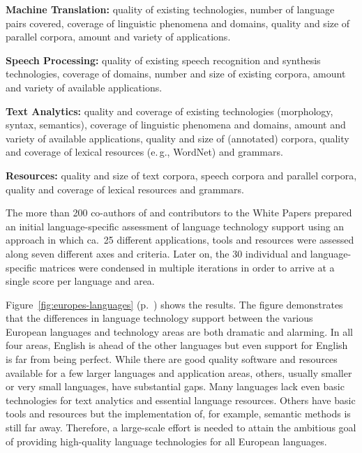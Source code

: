\documentclass[10pt, plain]{../../metanetpaper}
\begin{document}
\begin{multicols}{2}
\textbf{Machine Translation:} quality of existing technologies, number of language pairs covered, coverage of linguistic phenomena and domains, quality and size of parallel corpora, amount and variety of applications.

\textbf{Speech Processing:} quality of existing speech recognition and synthesis technologies, coverage of domains, number and size of existing corpora, amount and variety of available applications.

\textbf{Text Analytics:} quality and coverage of existing technologies (morphology, syntax, semantics), coverage of linguistic phenomena and domains, amount and variety of available applications, quality and size of (annotated) corpora, quality and coverage of lexical resources (e.\,g., WordNet) and grammars.

\textbf{Resources:} quality and size of text corpora, speech corpora and parallel corpora, quality and coverage of lexical resources and grammars.

The more than 200 co-authors of and contributors to the White Papers prepared an initial language-specific assessment of language technology support using an approach in which ca.~25 different applications, tools and resources were assessed along seven different axes and criteria. Later on, the 30 individual and language-specific matrices were condensed in multiple iterations in order to arrive at a single score per language and area. 

Figure~\ref{fig:europes-languages} (p.~\pageref{fig:europes-languages}) shows the results. The figure demonstrates that the differences in language technology support between the various European languages and technology areas are both dramatic and alarming. In all four areas, English is ahead of the other languages but even support for English is far from being perfect. While there are good quality software and resources available for a few larger languages and application areas, others, usually smaller or very small languages, have substantial gaps. Many languages lack even basic technologies for text analytics and essential language resources. Others have basic tools and resources but the implementation of, for example, semantic methods is still far away. Therefore, a large-scale effort is needed to attain the ambitious goal of providing high-quality language technologies for all European languages.


\end{multicols}
\end{document}
